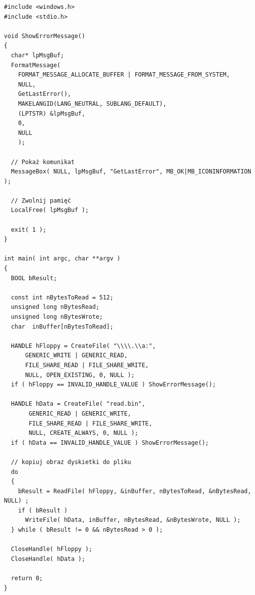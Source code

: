 \begin{scriptsize}
\begin{verbatim}
#include <windows.h>
#include <stdio.h>

void ShowErrorMessage()
{
  char* lpMsgBuf;
  FormatMessage( 
    FORMAT_MESSAGE_ALLOCATE_BUFFER | FORMAT_MESSAGE_FROM_SYSTEM,
    NULL,
    GetLastError(),
    MAKELANGID(LANG_NEUTRAL, SUBLANG_DEFAULT), 
    (LPTSTR) &lpMsgBuf,
    0,
    NULL 
    );

  // Pokaż komunikat
  MessageBox( NULL, lpMsgBuf, "GetLastError", MB_OK|MB_ICONINFORMATION );

  // Zwolnij pamięć
  LocalFree( lpMsgBuf );

  exit( 1 );
}

int main( int argc, char **argv )
{
  BOOL bResult;

  const int nBytesToRead = 512;
  unsigned long nBytesRead;
  unsigned long nBytesWrote;
  char  inBuffer[nBytesToRead];

  HANDLE hFloppy = CreateFile( "\\\\.\\a:", 
      GENERIC_WRITE | GENERIC_READ, 
      FILE_SHARE_READ | FILE_SHARE_WRITE,
      NULL, OPEN_EXISTING, 0, NULL );
  if ( hFloppy == INVALID_HANDLE_VALUE ) ShowErrorMessage();

  HANDLE hData = CreateFile( "read.bin", 
       GENERIC_READ | GENERIC_WRITE, 
       FILE_SHARE_READ | FILE_SHARE_WRITE,
       NULL, CREATE_ALWAYS, 0, NULL );  
  if ( hData == INVALID_HANDLE_VALUE ) ShowErrorMessage();

  // kopiuj obraz dyskietki do pliku
  do
  {
    bResult = ReadFile( hFloppy, &inBuffer, nBytesToRead, &nBytesRead, NULL) ; 
    if ( bResult )
      WriteFile( hData, inBuffer, nBytesRead, &nBytesWrote, NULL );
  } while ( bResult != 0 && nBytesRead > 0 );

  CloseHandle( hFloppy );
  CloseHandle( hData );

  return 0;
}
\end{verbatim}
\end{scriptsize}
